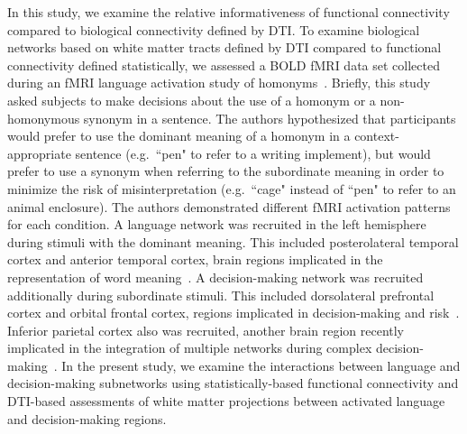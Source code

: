 \documentclass[final,authoryear,5p,times,twocolumn]{elsarticle}
\begin{document}
In this study, we examine the relative informativeness of functional connectivity compared to biological connectivity defined by DTI. To examine biological networks based on white matter tracts defined by DTI compared to functional connectivity defined statistically, we assessed a BOLD fMRI data set collected during an fMRI language activation study of homonyms~\cite{McMillan2010}. Briefly, this study asked subjects to make decisions about the use of a homonym or a non-homonymous synonym in a sentence. The authors hypothesized that participants would prefer to use the dominant meaning of a homonym in a context-appropriate sentence (e.g.\ ``pen" to refer to a writing implement), but would prefer to use a synonym when referring to the subordinate meaning in order to minimize the risk of misinterpretation (e.g.\ ``cage" instead of ``pen" to refer to an animal enclosure). The authors demonstrated different fMRI activation patterns for each condition. A language network was recruited in the left hemisphere during stimuli with the dominant meaning. This included posterolateral temporal cortex and anterior temporal cortex, brain regions implicated in the representation of word meaning~\cite{Bookheimer2002,Krain2006}. A decision-making network was recruited additionally during subordinate stimuli. This included dorsolateral prefrontal cortex and orbital frontal cortex, regions implicated in decision-making and risk~\cite{Rogers1999,Paulus2003,Krain2006}. Inferior parietal cortex also was recruited, another brain region recently implicated in the integration of multiple networks during complex decision-making~\cite{Krain2006}. In the present study, we examine the interactions between language and decision-making subnetworks using statistically-based functional connectivity and DTI-based assessments of white matter projections between activated language and decision-making regions.
\end{document}
